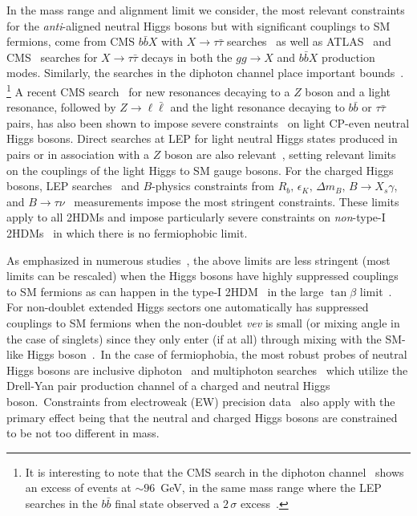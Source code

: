 \documentclass[../report.tex]{subfiles}
\begin{document}
In the mass range and alignment limit we consider, the most relevant
constraints for the \emph{anti}-aligned neutral Higgs bosons but with
significant couplings to SM fermions, come from CMS $b\bar{b}X$ with $X
\to \tau\bar{\tau}$ searches~\cite{Khachatryan:2015baw} as well as
ATLAS~\cite{Aad:2014vgg} and CMS~\cite{Khachatryan:2014wca} searches for
$X \to \tau\bar{\tau}$ decays in both the $gg \to X$ and $b\bar{b}X$
production modes. Similarly, the searches in the diphoton channel
  place important bounds~\cite{CMS-PAS-HIG-17-013,ATLAS-CONF-2018-025}.%
\footnote{It is interesting to note that the CMS search in the diphoton
  channel~\cite{CMS-PAS-HIG-17-013} shows an excess of events at $\sim
  96$~GeV, in the same mass range where the LEP searches in the 
  $b \bar b$ final state observed a $2\,\sigma$ excess~\cite{Schael:2006cr}.}
A recent CMS search~\cite{CMS:2015mba} for new
resonances decaying to a $Z$ boson and a light resonance, followed by 
$Z \to \ell\bar\ell$ and the light resonance decaying to $b\bar{b}$ or
$\tau\bar{\tau}$ pairs, has also been shown to impose severe
constraints~\cite{Bernon:2015wef} on light CP-even neutral Higgs
bosons. Direct searches at LEP for light neutral Higgs states produced
in pairs or in association with a $Z$ boson are also
relevant~\cite{Barate:2003sz,Abbiendi:2004gn,Schael:2006cr},
setting relevant limits on the couplings of the light Higgs to SM
gauge bosons. For
the charged Higgs bosons, LEP searches~\cite{Abbiendi:2013hk} and
$B$-physics constraints from $R_b,\,\epsilon_K,\,\Delta m_B,\,B\to
X_s\gamma$, and
$B\to\tau\nu$~\cite{Haisch:2008ar,Mahmoudi:2009zx,Gupta:2009wn,Jung:2010ik,Misiak:2015xwa}
measurements impose the most stringent constraints. These limits apply
to all 2HDMs and impose particularly severe constraints on
\emph{non}-type-I 2HDMs~\cite{Bernon:2015wef} in which there is no
fermiophobic limit.  

As emphasized in numerous studies~\cite{Ilisie:2014hea,Enberg:2016ygw,Delgado:2016arn,Degrande:2017naf,Vega:2018ddp}, the above limits are less stringent (most limits can be rescaled) when the Higgs bosons have highly suppressed couplings to SM fermions as can happen in the type-I 2HDM~\cite{Haber:1978jt} in the large $\tan\beta$ limit~\cite{Akeroyd:1995hg}. For non-doublet extended Higgs sectors one automatically has suppressed couplings to SM fermions when the non-doublet \emph{vev} is small (or mixing angle in the case of singlets) since they only enter (if at all) through mixing with the SM-like Higgs boson~\cite{Killick:2013mya}.~In the case of fermiophobia, the most robust probes of neutral Higgs bosons are inclusive diphoton~\cite{Delgado:2016arn,Degrande:2017naf,Vega:2018ddp} and multiphoton searches~\cite{Akeroyd:2005pr,Abdallah:2003xf,Aaltonen:2016fnw} which utilize the Drell-Yan pair production channel of a charged and neutral Higgs boson.~Constraints from electroweak (EW) precision data~\cite{Baak:2011ze,ALEPH:2010aa} also apply with the primary effect being that the neutral and charged Higgs bosons are constrained to be not too different in mass.  
\end{document}
